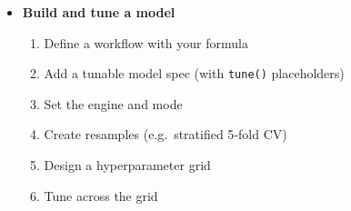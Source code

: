\documentclass[
]{book}
\providecommand{\tightlist}{%
  \setlength{\itemsep}{0pt}\setlength{\parskip}{0pt}}
\begin{document}
\begin{itemize}
\tightlist
\item
  \textbf{Build and tune a model}

  \begin{enumerate}
  \def\labelenumi{\arabic{enumi}.}
  \tightlist
  \item
    Define a workflow with your formula\\
  \item
    Add a tunable model spec (with \texttt{tune()} placeholders)\\
  \item
    Set the engine and mode\\
  \item
    Create resamples (e.g.~stratified 5‑fold CV)\\
  \item
    Design a hyperparameter grid\\
  \item
    Tune across the grid
  \end{enumerate}
\end{itemize}
\end{document}
